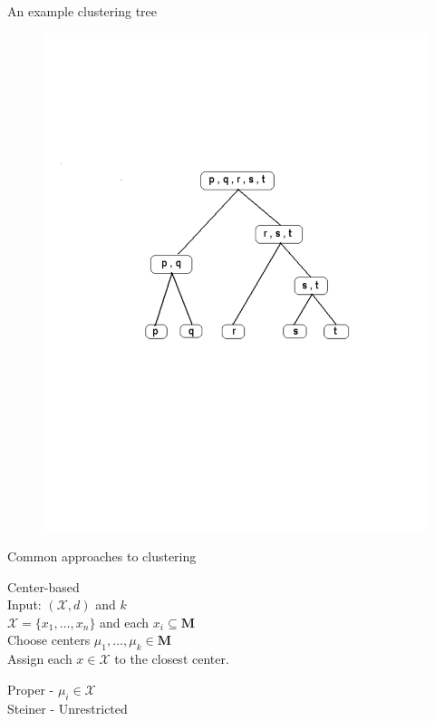 \documentclass{beamer}
\newcommand{\mc}{\mathcal}
\newcommand{\mb}{\mathbf}
\begin{document}
\begin{frame}{An example clustering tree}
	\begin{figure}
	  \includegraphics[trim = 50 150 50 200, clip, width=0.8\linewidth]{figures/hier.pdf}
	\end{figure}
\end{frame}

\begin{frame}{Common approaches to clustering}

	{\color{blue}Center-based} \\
	\vspace{0.4cm}Input: $(\mc X, d)$ and $k$\\
	$\mc X  =\{x_1, \ldots, x_n\}$ and each $ x_i \subseteq \mb M$\\   
	
	\vspace{1cm}\alert{Choose} centers $\mu_1, \ldots, \mu_k \in \mb M$\\
	\vspace{0.4cm}	Assign each $x \in \mc X$ to the closest center.
	
	\vspace{1cm}Proper - $\mu_i \in \mc X$\\
	\vspace{0.5cm}Steiner - Unrestricted\\
\end{frame}
\end{document}
